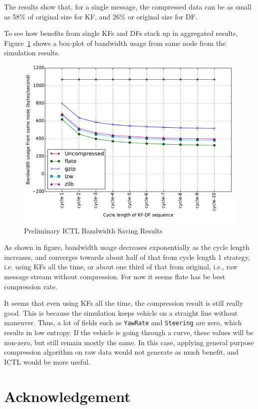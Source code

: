 \documentclass[12pt]{report}
\begin{document}
The results show that, for a single message, the compressed data can be as small as 58\% of original size for KF, and 26\% or original size for DF.

To see how benefits from single KFs and DFs stack up in aggregated results, Figure~\ref{fig:ictl_preliminary} shows a box-plot of bandwidth usage from same node from the simulation results.

\begin{figure}[h]
  \begin{center}
    \includegraphics[width=.9\textwidth]{figures/ictlPreliminary.pdf}
    \caption{\label{fig:ictl_preliminary}Preliminary ICTL Bandwidth Saving Results}
  \end{center}
\end{figure}

As shown in figure, bandwidth usage decreases exponentially as the cycle length increases, and converges towards about half of that from cycle length 1 strategy, i.e. using KFs all the time, or about one third of that from original, i.e., raw message stream without compression. For now it seems flate has be best compression rate.

It seems that even using KFs all the time, the compression result is still really good. This is because the simulation keeps vehicle on a straight line without maneuver. Thus, a lot of fields such as \texttt{YawRate} and \texttt{Steering} are zero, which results in low entropy. If the vehicle is going through a curve, these values will be non-zero, but still remain mostly the same. In this case, applying general purpose compression algorithm on raw data would not generate as much benefit, and ICTL would be more useful.



\chapter{Acknowledgement}





\end{document}
